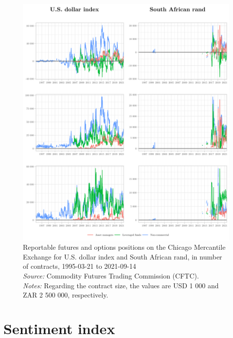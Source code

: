 \documentclass[a4paper, twoside]{templates/ociamthesis}
\begin{document}
\begin{figure}[!ht]

{\centering \includegraphics[width=0.99\columnwidth]{figure/GTOG_USDZAR} 

}

\caption[Reportable futures and options positions on the Chicago Mercantile Exchange for U.S. dollar index and South African rand, in number of contracts, 1995-03-21 to 2021-09-14]{Reportable futures and options positions on the Chicago Mercantile Exchange for U.S. dollar index and South African rand, in number of contracts, 1995-03-21 to 2021-09-14 \\ \scriptsize \textit{Source:} Commodity Futures Trading Commission (CFTC). \\ \scriptsize \textit{Notes:} Regarding the contract size, the values are USD 1 000 and ZAR 2 500 000, respectively.}\label{fig:FigureA35}
\end{figure}

\clearpage

\hypertarget{appendixa4}{%
\section{Sentiment index}\label{appendixa4}}
\end{document}
